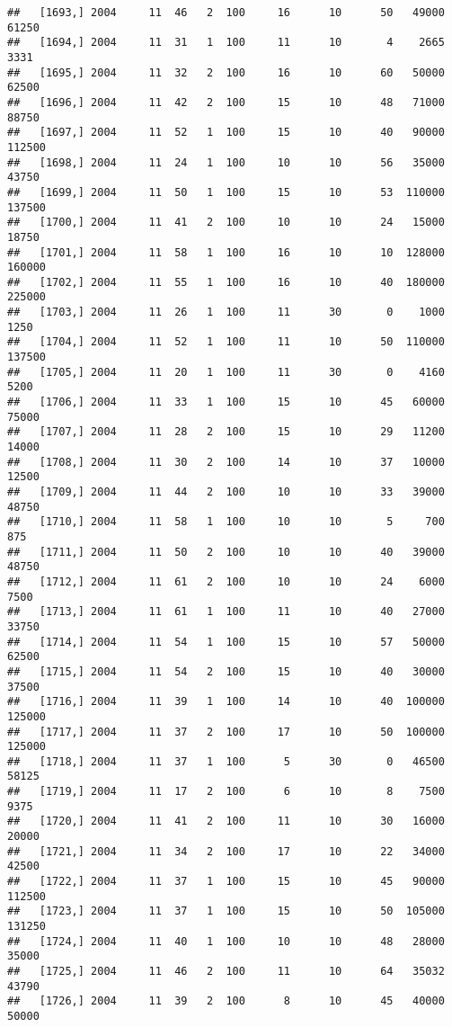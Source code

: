 \documentclass{article}\usepackage[]{graphicx}\usepackage[]{color}
\makeatletter
\newenvironment{kframe}{%
 \def\at@end@of@kframe{}%
 \ifinner\ifhmode%
  \def\at@end@of@kframe{\end{minipage}}%
  \begin{minipage}{\columnwidth}%
 \fi\fi%
 \def\FrameCommand##1{\hskip\@totalleftmargin \hskip-\fboxsep
 \colorbox{shadecolor}{##1}\hskip-\fboxsep
     \hskip-\linewidth \hskip-\@totalleftmargin \hskip\columnwidth}%
 \MakeFramed {\advance\hsize-\width
   \@totalleftmargin\z@ \linewidth\hsize
   \@setminipage}}%
 {\par\unskip\endMakeFramed%
 \at@end@of@kframe}
\newenvironment{knitrout}{}{} %
\makeatother
\begin{document}
\begin{knitrout}
\begin{kframe}
\begin{verbatim}
##   [1693,] 2004     11  46   2  100     16      10      50   49000   61250
##   [1694,] 2004     11  31   1  100     11      10       4    2665    3331
##   [1695,] 2004     11  32   2  100     16      10      60   50000   62500
##   [1696,] 2004     11  42   2  100     15      10      48   71000   88750
##   [1697,] 2004     11  52   1  100     15      10      40   90000  112500
##   [1698,] 2004     11  24   1  100     10      10      56   35000   43750
##   [1699,] 2004     11  50   1  100     15      10      53  110000  137500
##   [1700,] 2004     11  41   2  100     10      10      24   15000   18750
##   [1701,] 2004     11  58   1  100     16      10      10  128000  160000
##   [1702,] 2004     11  55   1  100     16      10      40  180000  225000
##   [1703,] 2004     11  26   1  100     11      30       0    1000    1250
##   [1704,] 2004     11  52   1  100     11      10      50  110000  137500
##   [1705,] 2004     11  20   1  100     11      30       0    4160    5200
##   [1706,] 2004     11  33   1  100     15      10      45   60000   75000
##   [1707,] 2004     11  28   2  100     15      10      29   11200   14000
##   [1708,] 2004     11  30   2  100     14      10      37   10000   12500
##   [1709,] 2004     11  44   2  100     10      10      33   39000   48750
##   [1710,] 2004     11  58   1  100     10      10       5     700     875
##   [1711,] 2004     11  50   2  100     10      10      40   39000   48750
##   [1712,] 2004     11  61   2  100     10      10      24    6000    7500
##   [1713,] 2004     11  61   1  100     11      10      40   27000   33750
##   [1714,] 2004     11  54   1  100     15      10      57   50000   62500
##   [1715,] 2004     11  54   2  100     15      10      40   30000   37500
##   [1716,] 2004     11  39   1  100     14      10      40  100000  125000
##   [1717,] 2004     11  37   2  100     17      10      50  100000  125000
##   [1718,] 2004     11  37   1  100      5      30       0   46500   58125
##   [1719,] 2004     11  17   2  100      6      10       8    7500    9375
##   [1720,] 2004     11  41   2  100     11      10      30   16000   20000
##   [1721,] 2004     11  34   2  100     17      10      22   34000   42500
##   [1722,] 2004     11  37   1  100     15      10      45   90000  112500
##   [1723,] 2004     11  37   1  100     15      10      50  105000  131250
##   [1724,] 2004     11  40   1  100     10      10      48   28000   35000
##   [1725,] 2004     11  46   2  100     11      10      64   35032   43790
##   [1726,] 2004     11  39   2  100      8      10      45   40000   50000

\end{verbatim}
\end{kframe}
\end{knitrout}
\end{document}

